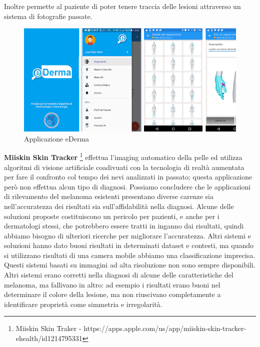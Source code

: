 {Inoltre permette al paziente di poter tenere traccia delle lesioni attraverso un sistema di fotografie passate.
	\begin{figure}[h]
	\begin{center}     
		\includegraphics[scale=0.60]{figure/capitolo2/ederma.png}
	\end{center}
	\caption{Applicazione eDerma}	
\end{figure}
\newline
\textbf{Miiskin Skin Tracker} \footnote{Miiskin Skin Traker - https://apps.apple.com/us/app/miiskin-skin-tracker-ehealth/id1214795331} effettua l'imaging automatico della pelle ed utilizza algoritmi di visione artificiale coadivuati con la tecnologia di realtà aumentata per fare il confronto col tempo dei nevi analizzati in passato; questa applicazione però non effettua alcun tipo di diagnosi.
\newline
	Possiamo concludere che le applicazioni di rilevamento del melanoma esistenti presentano diverse carenze sia nell'accuratezza dei risultati sia sull'affidabilità nella diagnosi.
	\newline
	Alcune delle soluzioni proposte costituiscono un pericolo per pazienti, e anche per i dermatologi stessi, che potrebbero essere tratti in inganno dai risultati, quindi abbiamo bisogno di ulteriori ricerche per migliorare l'accuratezza.
	\newline
	Altri sistemi e soluzioni hanno dato buoni risultati in determinati dataset e contesti, ma quando si utilizzano risultati di una camera mobile abbiamo una classificazione imprecisa.
	\newline
	Questi sistemi basati su immagini ad alta risoluzione non sono sempre disponibili. 
	Altri sistemi erano corretti nella diagnosi di alcune delle caratteristiche del melanoma, ma fallivano in altro: ad esempio i risultati erano buoni nel determinare il colore della lesione, ma non riuscivano completamente a identificare proprietà come simmetria e irregolarità.
}
